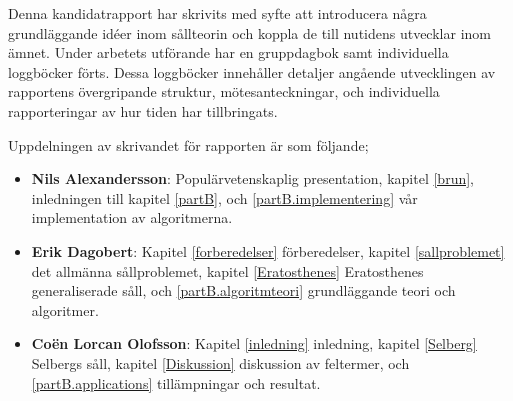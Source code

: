Denna kandidatrapport har skrivits med syfte att introducera några grundläggande idéer inom sållteorin och koppla de till nutidens utvecklar inom ämnet.
Under arbetets utförande har en gruppdagbok samt individuella loggböcker förts.
Dessa loggböcker innehåller detaljer angående utvecklingen av rapportens övergripande struktur, mötesanteckningar, och individuella rapporteringar av hur tiden har tillbringats.

Uppdelningen av skrivandet för rapporten är som följande;
\begin{itemize}
    \item \textbf{Nils Alexandersson}: Populärvetenskaplig presentation, kapitel \ref{brun}, inledningen till kapitel \ref{partB}, och \ref{partB.implementering} vår implementation av algoritmerna.
    \item \textbf{Erik Dagobert}: Kapitel \ref{forberedelser} förberedelser, kapitel \ref{sallproblemet} det allmänna sållproblemet, kapitel \ref{Eratosthenes} Eratosthenes generaliserade såll, och \ref{partB.algoritmteori} grundläggande teori och algoritmer. 
    \item \textbf{Coën Lorcan Olofsson}: Kapitel \ref{inledning} inledning, kapitel \ref{Selberg} Selbergs såll, kapitel \ref{Diskussion} diskussion av feltermer, och \ref{partB.applications} tillämpningar och resultat.
\end{itemize}